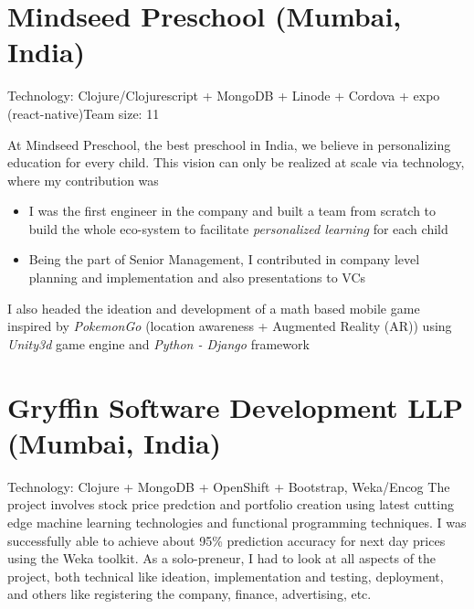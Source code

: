 \documentclass[11pt,a4paper,sans]{moderncv} %
\begin{document}
\section{Mindseed Preschool (Mumbai, India)}
         {Technology: Clojure/Clojurescript + MongoDB + Linode + Cordova + expo (react-native)}{Team size: 11}
         {At Mindseed Preschool, the best preschool in India, we believe in personalizing education for every child. This vision can only be realized at scale via technology, where my contribution was
           \begin{itemize}
           \item I was the first engineer in the company and built a team from scratch to build the whole eco-system to facilitate \textit{personalized learning} for each child
           \item Being the part of Senior Management, I contributed in company level planning and implementation and also presentations to VCs
           \end{itemize}
           I also headed the ideation and development of a math based mobile game inspired by \textit{PokemonGo} (location awareness + Augmented Reality (AR)) using \textit{Unity3d} game engine and \textit{Python - Django} framework}

\section{Gryffin Software Development LLP (Mumbai, India)}
         {}{Technology: Clojure + MongoDB + OpenShift + Bootstrap, Weka/Encog}
         {The project involves stock price predction and portfolio creation using latest cutting edge machine learning technologies and functional programming techniques. I was successfully able to achieve about 95\% prediction accuracy for next day prices using the Weka toolkit. As a solo-preneur, I had to look at all aspects of the project, both technical like ideation, implementation and testing, deployment, and others like registering the company, finance, advertising, etc.}
\end{document}
